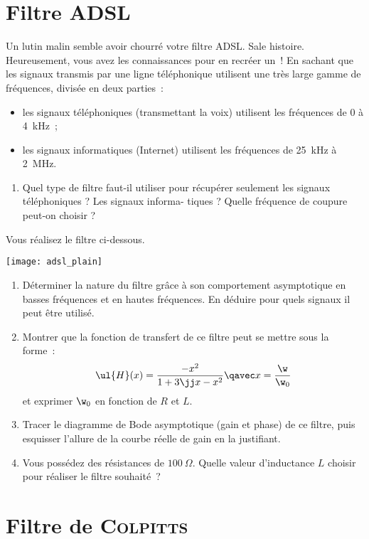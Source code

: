 \documentclass[a4paper, 12pt, final, garamond]{book}
\begin{document}
\section{Filtre ADSL}
Un lutin malin semble avoir chourré votre filtre ADSL. Sale histoire.
Heureusement, vous avez les connaissances pour en recréer un~! En sachant que
les signaux transmis par une ligne téléphonique utilisent une très large gamme
de fréquences, divisée en deux parties~:
\begin{itemize}
    \item les signaux téléphoniques (transmettant la voix) utilisent les
        fréquences de 0 à \SI{4}{kHz}~;
    \item les signaux informatiques (Internet) utilisent les fréquences de
        \SI{25}{kHz} à \SI{2}{MHz}.
\end{itemize}

\begin{enumerate}
    \item Quel type de filtre faut-il utiliser pour récupérer seulement les
        signaux téléphoniques ? Les signaux informa- tiques ? Quelle fréquence
        de coupure peut-on choisir ?
\end{enumerate}
Vous réalisez le filtre ci-dessous.
\begin{center}
    \texttt{[image: adsl\_plain]}
\end{center}

\begin{enumerate}[resume]
    \item Déterminer la nature du filtre grâce à son comportement asymptotique
        en basses fréquences et en hautes fréquences. En déduire pour quels
        signaux il peut être utilisé.
    \item Montrer que la fonction de transfert de ce filtre peut se mettre sous
        la forme~:
        \[\ul{H}(x) = \frac{-x^2}{1 + 3\jj x-x^2}
            \qavec
            x = \frac{\w}{\w_0}
        \]
        et exprimer $\w_0$ en fonction de $R$ et $L$.
    \item Tracer le diagramme de Bode asymptotique (gain et phase) de ce filtre,
        puis esquisser l'allure de la courbe réelle de gain en la justifiant.
    \item Vous possédez des résistances de $\SI{100}{\Omega}$. Quelle valeur
        d'inductance $L$ choisir pour réaliser le filtre souhaité~?
\end{enumerate}

\section{Filtre de \textsc{Colpitts}}
\end{document}
